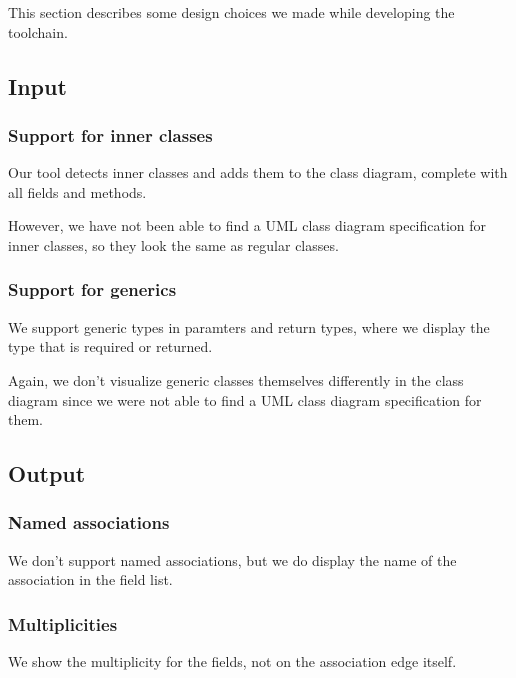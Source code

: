This section describes some design choices we made while developing the toolchain.

\subsection{Input}
	\subsubsection{Support for inner classes}
		Our tool detects inner classes and adds them to the class diagram, complete with all fields and methods.
		
		However, we have not been able to find a UML class diagram specification for inner classes, so they look the same as regular classes.
	\subsubsection{Support for generics}
		We support generic types in paramters and return types, where we display the type that is required or returned.
		
		Again, we don't visualize generic classes themselves differently in the class diagram since we were not able to find a UML class diagram specification for them.

\subsection{Output}
	\subsubsection{Named associations}
		We don't support named associations, but we do display the name of the association in the field list.
	\subsubsection{Multiplicities}
		We show the multiplicity for the fields, not on the association edge itself.

